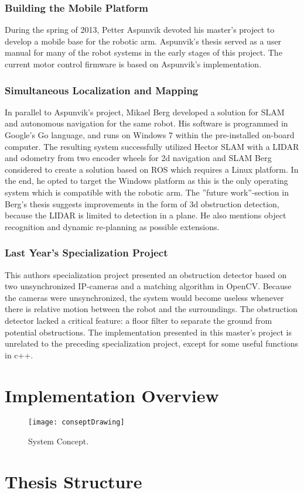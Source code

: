 \subsubsection{Building the Mobile Platform}
During the spring of 2013, Petter Aspunvik devoted his master's project to develop a mobile base for the robotic arm\cite{aspunvik}. Aspunvik's thesis served as a user manual for many of the robot systems in the early stages of this project. The current motor control firmware is based on Aspunvik's implementation. 

\subsubsection{Simultaneous Localization and Mapping}

In parallel to Aspunvik's project, Mikael Berg developed a solution for \ac{SLAM} and autonomous navigation for the same robot\cite{berg}. His software is programmed in Google's Go language, and runs on Windows 7 within the pre-installed on-board computer. The resulting system successfully utilized Hector SLAM with a LIDAR and odometry from two encoder wheels for 2d navigation and \ac{SLAM} Berg considered to create a solution based on \ac{ROS} which requires a Linux platform. In the end, he opted to target the Windows platform as this is the only operating system which is compatible with the robotic arm. The ''future work''-section in Berg's thesis suggests improvements in the form of 3d obstruction detection, because the LIDAR is limited to detection in a plane. He also mentions object recognition and dynamic re-planning as possible extensions. 

\subsubsection{Last Year's Specialization Project}

This authors specialization project\cite{lindrup} presented an obstruction detector based on two unsynchronized IP-cameras and a matching algorithm in \ac{OpenCV}. Because the cameras were unsynchronized, the system would become useless whenever there is relative motion between the robot and the surroundings. The obstruction detector lacked a critical feature: a floor filter to separate the ground from potential obstructions. The implementation presented in this master's project is unrelated to the preceding specialization project, except for some useful functions in c++.

\section{Implementation Overview}

\begin{figure}[p]
	\centering
	\texttt{[image: conseptDrawing]}
	\caption{System Concept. }
	\label{fig:conseptDrawing}
\end{figure}

\section{Thesis Structure}